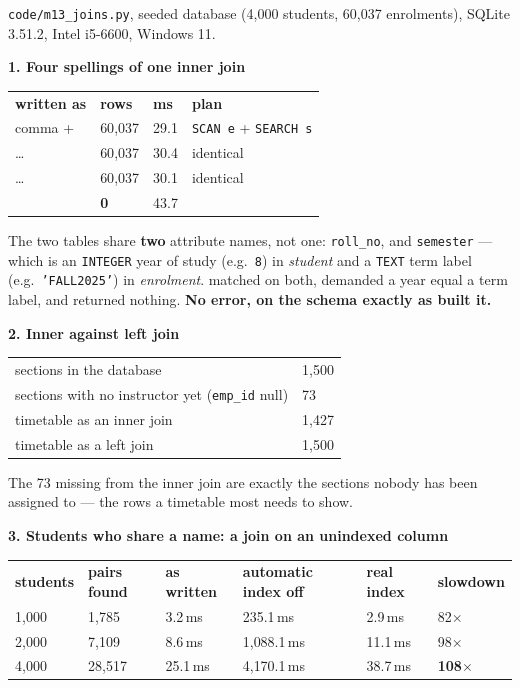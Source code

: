 \begin{measured}
\textsf{\footnotesize \texttt{code/m13\_joins.py}, seeded database (4{,}000
students, 60{,}037 enrolments), SQLite 3.51.2, Intel i5-6600, Windows 11.}

\medskip
\textbf{1. Four spellings of one inner join}

\begin{tabular}{@{}L{4.6cm}R{1.9cm}R{1.7cm}L{5.6cm}@{}}
\textbf{written as} & \textbf{rows} & \textbf{ms} & \textbf{plan} \\
comma +   & 60{,}037 & 29.1 & \texttt{SCAN e} + \texttt{SEARCH s} \\
 \dots\  & 60{,}037 & 30.4 & identical \\
 \dots\  & 60{,}037 & 30.1 & identical \\
 & \textbf{0} & 43.7 & \\
\end{tabular}

\smallskip
The two tables share \textbf{two} attribute names, not one:
\texttt{roll\_no}, and \texttt{semester} --- which is an \texttt{INTEGER} year
of study (e.g.\ \texttt{8}) in \textit{student} and a \texttt{TEXT} term label
(e.g.\ \texttt{'FALL2025'}) in \textit{enrolment}.  matched
on both, demanded a year equal a term label, and returned nothing. \textbf{No
error, on the schema exactly as  built it.}

\medskip
\textbf{2. Inner against left join}

\begin{tabular}{@{}L{9.4cm}R{2.4cm}@{}}
sections in the database & 1{,}500 \\
sections with no instructor yet (\texttt{emp\_id} null) & 73 \\
timetable as an inner join & 1{,}427 \\
timetable as a left join & 1{,}500 \\
\end{tabular}

\smallskip
The 73 missing from the inner join are exactly the sections nobody has been
assigned to --- the rows a timetable most needs to show.

\medskip
\textbf{3. Students who share a name: a join on an unindexed column}

\begin{tabular}{@{}R{1.6cm}R{2.0cm}R{1.9cm}R{2.4cm}R{2.0cm}R{1.8cm}@{}}
\textbf{students} & \textbf{pairs found} & \textbf{as written}
& \textbf{automatic index off} & \textbf{real index} & \textbf{slowdown} \\
1{,}000 & 1{,}785  & 3.2\,ms  & 235.1\,ms  & 2.9\,ms  & 82$\times$ \\
2{,}000 & 7{,}109  & 8.6\,ms  & 1{,}088.1\,ms & 11.1\,ms & 98$\times$ \\
4{,}000 & 28{,}517 & 25.1\,ms & 4{,}170.1\,ms & 38.7\,ms & \textbf{108$\times$} \\
\end{tabular}


\end{measured}
